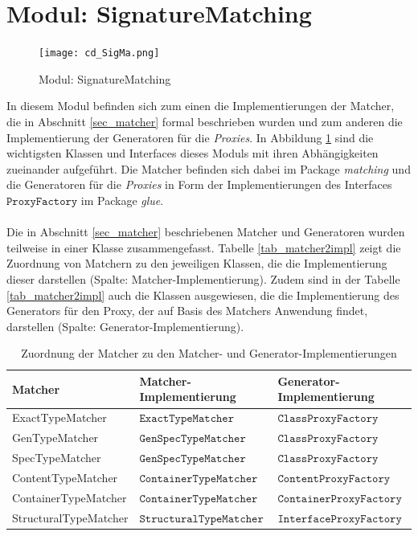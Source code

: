 \section{Modul: SignatureMatching}\label{impl_sigma}
\begin{figure}[h!]
\texttt{[image: cd\_SigMa.png]}
\caption{Modul: SignatureMatching}
\label{fig_cdSigMa}
\end{figure}
\noindent
In diesem \Gls{Modul} befinden sich zum einen die Implementierungen der Matcher, die in Abschnitt \ref{sec_matcher} formal beschrieben wurden und zum anderen die Implementierung der Generatoren für die \emph{Proxies}. In Abbildung \ref{fig_cdSigMa} sind die wichtigsten Klassen und \Gls{Interface}s dieses \Gls{Modul}s mit ihren Abhängigkeiten zueinander aufgeführt. Die Matcher befinden sich dabei im Package \emph{matching} und die Generatoren für die \emph{Proxies} in Form der Implementierungen des \Gls{Interface}s $\texttt{ProxyFactory}$ im Package \emph{glue}.
\\\\
Die in Abschnitt \ref{sec_matcher} beschriebenen Matcher und Generatoren wurden teilweise in einer Klasse zusammengefasst. Tabelle \ref{tab_matcher2impl} zeigt die Zuordnung von Matchern zu den jeweiligen Klassen, die die Implementierung dieser darstellen (Spalte: Matcher-Implementierung). Zudem sind in der Tabelle \ref{tab_matcher2impl} auch die Klassen ausgewiesen, die die Implementierung des Generators für den Proxy, der auf Basis des Matchers Anwendung findet, darstellen (Spalte: Generator-Implementierung).
\begin{table}[h!]
\centering
\begin{tabular}{|l|l|l|}
\hline
\hline
\textbf{Matcher} & \textbf{Matcher-Implementierung} & \textbf{Generator-Implementierung}\\
\hline
ExactTypeMatcher & $\texttt{ExactTypeMatcher}$ & $\texttt{ClassProxyFactory}$ \\
\hline
GenTypeMatcher & $\texttt{GenSpecTypeMatcher}$ & $\texttt{ClassProxyFactory}$\\
\hline
SpecTypeMatcher & $\texttt{GenSpecTypeMatcher}$ & $\texttt{ClassProxyFactory}$\\
\hline
ContentTypeMatcher & $\texttt{ContainerTypeMatcher}$ & $\texttt{ContentProxyFactory}$\\
\hline
ContainerTypeMatcher & $\texttt{ContainerTypeMatcher}$ & $\texttt{ContainerProxyFactory}$\\
\hline
StructuralTypeMatcher & $\texttt{StructuralTypeMatcher}$ & $\texttt{InterfaceProxyFactory}$\\
\hline
\hline
\end{tabular}
\caption{Zuordnung der Matcher zu den Matcher- und Generator-Implementierungen}
\end{table}\label{tab_matcher2impl}
